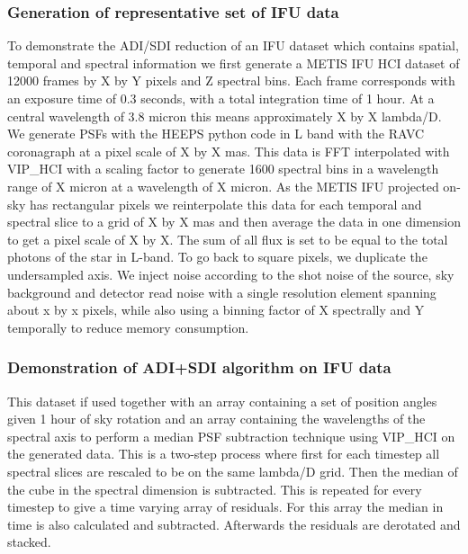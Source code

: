 \subsubsection{Generation of representative set of IFU data}

To demonstrate the ADI/SDI reduction of an IFU dataset which contains spatial, temporal and spectral information we first generate a METIS IFU HCI dataset of 12000 frames by X by Y pixels and Z spectral bins. Each frame corresponds with an exposure time of 0.3 seconds, with a total integration time of 1 hour. At a central wavelength of 3.8 micron this means approximately X by X lambda/D. 
We generate PSFs with the HEEPS python code in L band with the RAVC coronagraph at a pixel scale of X by X mas. This data is FFT interpolated with VIP\_HCI with a scaling factor to generate 1600 spectral bins in a wavelength range of X micron at a wavelength of X micron.
As the METIS IFU projected on-sky has rectangular pixels we reinterpolate this data for each temporal and spectral slice to a grid of X by X mas and then average the data in one dimension to get a pixel scale of X by X. The sum of all flux is set to be equal to the total photons of the star in L-band.
To go back to square pixels, we duplicate the undersampled axis. We inject noise according to the shot noise of the source, sky background and detector read noise with a single resolution element spanning about x by x pixels, while also using a binning factor of X spectrally and Y temporally to reduce memory consumption.



 


\subsubsection{Demonstration of ADI+SDI algorithm on IFU data}


This dataset if used together with an array containing a set of position angles given 1 hour of sky rotation and an array containing the wavelengths of the spectral axis to perform a median PSF subtraction technique using VIP\_HCI on the generated data. This is a two-step process where first for each timestep all spectral slices are rescaled to be on the same lambda/D grid. Then the median of the cube in the spectral dimension is subtracted. This is repeated for every timestep to give a time varying array of residuals. For this array the median in time is also calculated and subtracted. Afterwards the residuals are derotated and stacked. 